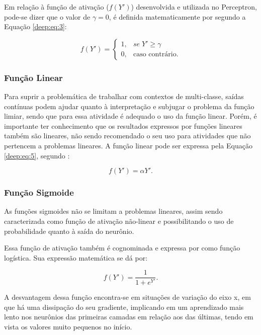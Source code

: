 Em relação à função de ativação ($f(Y')$) desenvolvida e utilizada no Perceptron, pode-se dizer que o valor de $\gamma = 0$, é definida matematicamente por \cite{mcculloch1943logical} segundo a Equação \ref{deep:eq:3}:

\begin{equation}
    \label{deep:eq:3}
    f(Y') = \begin{cases}
     1,& se \; Y' \geq \gamma \\ 
     0,& \text{caso contrário}.
    \end{cases}
\end{equation}


\subsubsection{Função Linear}
\label{deep:linear}
Para suprir a problemática de trabalhar com contextos de multi-classe, saídas contínuas podem ajudar quanto à interpretação e subjugar o problema da função limiar, sendo que para essa atividade é adequado o uso da função linear. Porém, é importante ter conhecimento que os resultados expressos por funções lineares também são lineares, não sendo recomendado o seu uso para atividades que não pertencem a problemas lineares. A função linear pode ser expressa pela Equação \ref{deep:eq:5}, segundo \cite{Rosenblatt1958}:

\begin{equation}
    \label{deep:eq:5}
    f(Y') = \alpha Y'.
\end{equation}


\subsubsection{Função Sigmoide}
\label{deep:sigmoide}
As funções sigmoides não se limitam a problemas lineares, assim sendo caracterizada como função de ativação não-linear e possibilitando o uso de probabilidade quanto à saída do neurônio.

Essa função de ativação também é cognominada e expressa por \cite{glorot2011deep} como função logística. Sua expressão matemática se dá por:

\begin{equation}
    \label{deep:eq:6}
    f(Y') = \frac{1}{1 + e^{Y'}}.
\end{equation}

A desvantagem dessa função encontra-se em situações de variação do eixo x, em que há uma  dissipação do seu gradiente, implicando em um aprendizado mais lento nos neurônios das primeiras camadas em relação aos das últimas, tendo em vista os valores muito pequenos no início.

